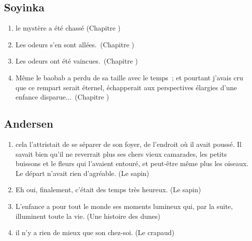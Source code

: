 \documentclass[a4paper, 11pt, hidelinks]{article}
\newcommand{\rb}[1]{\Romanbar{#1}}
\begin{document}
\subsection{Soyinka}


\begin{enumerate}
    \item le mystère a été chassé (Chapitre \rb{1})
    \item Les odeurs s'en sont allées. (Chapitre \rb{10})
    \item Les odeurs ont été vaincues. (Chapitre \rb{10})
    \item Même le baobab a perdu de sa taille avec le temps ; et pourtant j'avais cru que ce rempart serait éternel, échapperait aux perspectives élargies d'une enfance disparue... (Chapitre \rb{5})
\end{enumerate}




\subsection{Andersen}


\begin{enumerate}
    \item cela l'attristait de se séparer de son foyer, de l'endroit où il avait poussé. Il savait bien qu'il ne reverrait plus ses chers vieux camarades, les petits buissons et le fleurs qui l'avaient entouré, et peut-être même plus les oiseaux. Le départ n'avait rien d'agréable. (Le sapin)
    \item Eh oui, finalement, c'était des temps très heureux. (Le sapin)
    \item L'enfance a pour tout le monde ses moments lumineux qui, par la suite, illuminent toute la vie. (Une histoire des dunes)
    \item il n'y a rien de mieux que son chez-soi. (Le crapaud)
\end{enumerate}
\end{document}
